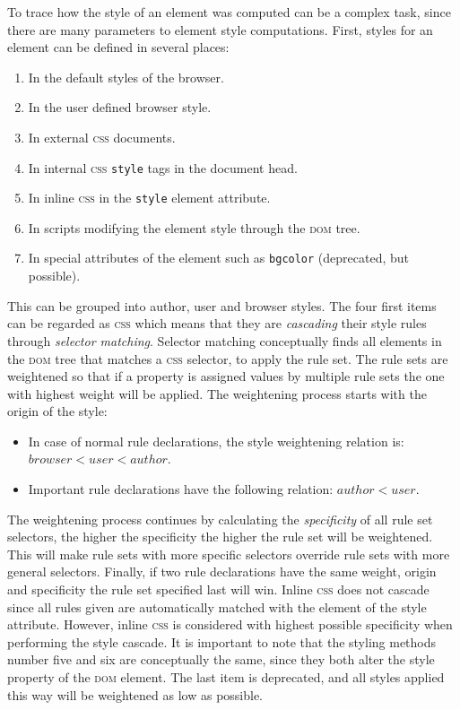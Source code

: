 \documentclass[a4paper,11pt]{kth-mag}
\newcommand{\code}[1]{\texttt{#1}}
\begin{document}
        To trace how the style of an element was computed can be a complex task, since there are many parameters to element style computations.
        First, styles for an element can be defined in several places:
        \begin{enumerate}
          \item In the default styles of the browser.
          \item In the user defined browser style.
          \item In external \textsc{css} documents.
          \item In internal \textsc{css} \code{style} tags in the document head.
          \item In inline \textsc{css} in the \code{style} element attribute.
          \item In scripts modifying the element style through the \textsc{dom} tree.
          \item In special attributes of the element such as \code{bgcolor} (deprecated, but possible).
        \end{enumerate}
        This can be grouped into author, user and browser styles.
        The four first items can be regarded as \textsc{css} which means that they are \emph{cascading} their style rules through \emph{selector matching}.
        Selector matching conceptually finds all elements in the \textsc{dom} tree that matches a \textsc{css} selector, to apply the rule set.
        The rule sets are weightened so that if a property is assigned values by multiple rule sets the one with highest weight will be applied.
        The weightening process starts with the origin of the style:
        \begin{itemize}
          \item In case of normal rule declarations, the style weightening relation is: $browser < user < author$.
          \item Important rule declarations have the following relation: $author < user$.
        \end{itemize}
        The weightening process continues by calculating the \emph{specificity} of all rule set selectors, the higher the specificity the higher the rule set will be weightened.
        This will make rule sets with more specific selectors override rule sets with more general selectors.
        Finally, if two rule declarations have the same weight, origin and specificity the rule set specified last will win.
        Inline \textsc{css} does not cascade since all rules given are automatically matched with the element of the style attribute.
        However, inline \textsc{css} is considered with highest possible specificity when performing the style cascade.
        It is important to note that the styling methods number five and six are conceptually the same, since they both alter the style property of the \textsc{dom} element.
        The last item is deprecated, and all styles applied this way will be weightened as low as possible.
\end{document}
